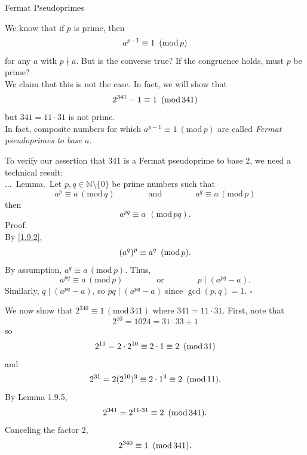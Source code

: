 \documentclass[smaller,hyperref={CJKbookmarks=true}]{beamer}
\newcommand{\N}{\mathbb{N}} \newcommand{\Z}{\mathbb{Z}} \newcommand{\Q}{\mathbb{Q}}
\newenvironment{PROOF}{{\noindent\!\sf\alert{Proof.}}\\}{\hfill$\square$\\}
\newcounter{zhuo}[subsection]
\renewcommand{\thezhuo}{\thesection.\thesubsection.\arabic{zhuo}}
\newenvironment{LEMMA}{\stepcounter{zhuo}\alert{\thezhuo.~Lemma.\,}}{}
\begin{document}
\begin{frame}{Fermat Pseudoprimes}
\begin{spacing}{1.1}
We know that if $p$ is prime, then
\[a^{p-1}\equiv1\enskip(\text{mod}\,p)\]
for any $a$ with $p\nmid a$. But is the converse true? If the congruence holds, must $p$ be prime?\\[5pt]
We claim that this is not the case. In fact, we will show that
\[2^{341}-1\equiv1\enskip(\text{mod}\,341)\]
but $341=11\cdot31$ is not prime.\\[5pt]
In fact, composite numbers for which $a^{p-1}\equiv1~(\text{mod}\,p)$ are called \emph{Fermat pseudoprimes to base $a$}.
\end{spacing}
\newpage
\begin{spacing}{0.9}
To verify our assertion that 341 is a Fermat pseudoprime to base 2, we need a technical result:\\[5pt]
\begin{LEMMA}
Let $p,q\in\N\setminus\{0\}$ be prime numbers such that
\[a^p\equiv a\,(\text{mod}\,q)\qquad\qquad
\text{and}\qquad\qquad a^q\equiv a\,(\text{mod}\,p)\]
then
\[a^{pq}\equiv a~\,(\text{mod}\,pq).\]
\end{LEMMA}
\begin{PROOF}
By \eqref{1.9.2},
\[(a^q)^p\equiv a^q\enskip(\text{mod}\,p).\]
By assumption, $a^q\equiv a\,(\text{mod}\,p)$. Thus,
\[a^{pq}\equiv a\,(\text{mod}\,p)\qquad\qquad
\text{or}\qquad\qquad p\mid(a^{pq}-a).\]
Similarly, $q\mid(a^{pq}-a)$, so $pq\mid(a^{pq}-a)$ since $\gcd(p,q)=1$.
\end{PROOF}
\end{spacing}
\newpage
\begin{spacing}{1.05}
We now show that $2^{340}\equiv1\,(\text{mod}\,341)$ where $341=11\cdot31$. First, note that
\[2^{10}=1024=31\cdot33+1\]
so
\[2^{11}=2\cdot2^{10}\equiv2\cdot1\equiv2\enskip
(\text{mod}\,31)\]
and
\[2^{31}=2(2^{10})^3\equiv2\cdot1^3\equiv2\enskip
(\text{mod}\,11).\]
By Lemma 1.9.5,
\[2^{341}=2^{11\cdot31}\equiv2\enskip(\text{mod}\,341).\]
Canceling the factor 2,
\[2^{340}\equiv1\enskip(\text{mod}\,341).\]
\end{spacing}
\end{frame}
\end{document}
